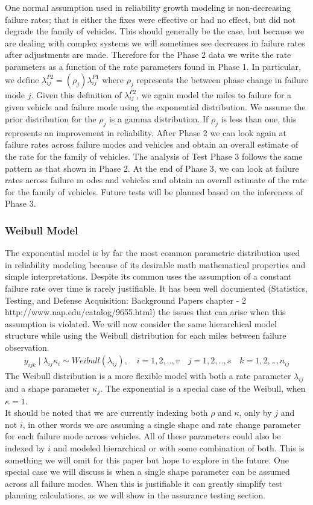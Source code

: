 \documentclass[12pt]{article}
\begin{document}
One normal assumption used in reliability growth modeling is non-decreasing
failure rates; that is either the fixes were effective or had no effect, but did
not degrade the family of vehicles.  This should generally be the case, but
because we are dealing with complex systems we will sometimes see decreases in
failure rates after adjustments are made.  Therefore for the Phase 2 data we
write the rate parameters as a function of the rate parameters found in Phase 1.
In particular, we define $\lambda_{ij}^{P2}=(\rho_{j})\lambda_{ij}^{P1}$ where
$\rho_{j}$ represents the between phase change in failure mode $j$. Given this
definition of $\lambda_{ij}^{P2}$, we again model the miles to failure for a given
vehicle and failure mode using the exponential distribution. We assume the prior
distribution for the $\rho_{j}$ is a gamma distribution.  If $\rho_{j}$ is less
than one, this represents an improvement in reliability.  After Phase 2 we can
look again at failure rates across failure modes and vehicles and obtain an
overall estimate of the rate for the family of vehicles.  The analysis of Test
Phase 3 follows the same pattern as that shown in Phase 2. At the end of
Phase 3, we can look at failure rates across failure m odes and vehicles and
obtain an overall estimate of the rate for the family of vehicles.
Future tests will be planned based on the inferences of Phase 3.

\subsubsection{Weibull Model}
The exponential model is by far the most common parametric distribution used in
reliability modeling because of its desirable math mathematical properties and
simple interpretations.   Despite its common uses the assumption of a constant
failure rate over time is rarely justifiable.  It has been well documented
(Statistics, Testing, and Defense Acquisition: Background Papers chapter - 2 http://www.nap.edu/catalog/9655.html)
the issues that can arise when this assumption is violated.  We will now
consider the same hierarchical model structure while using the Weibull
distribution for each miles between failure observation.
\begin{align}
y_{ijk}\mid\lambda_{ij}\kappa_{i}\sim Weibull(\lambda_{ij}), \quad i = 1,2,..,v \quad j=1,2,..,s \quad k=1,2,..,n_{ij}
\end{align}
The Weibull distribution is a more flexible model with both a rate parameter
$\lambda_{ij}$ and a shape parameter $\kappa_{j}$.  The exponential is a special
case of the Weibull, when $\kappa = 1$.
\\
It should be noted that we are currently indexing both $\rho$ and $\kappa$, only
by $j$ and not $i$, in other words we are assuming a single shape and rate
change parameter for each failure mode across vehicles.  All of these parameters
could also be indexed by $i$ and modeled hierarchical or with some combination
of both.  This is something we will omit for this paper but hope to explore in
the future.  One special case we will discuss is when a single shape parameter
can be assumed across all failure modes.  When this is justifiable it can
greatly simplify test planning calculations, as we will show in the assurance
testing section.
\end{document}

